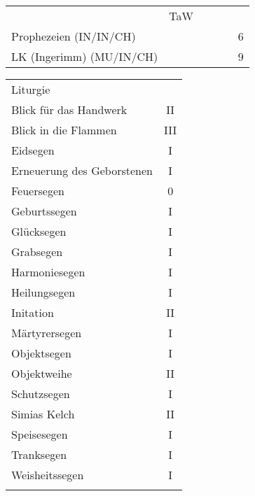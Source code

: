 \documentclass{article}
\newcommand{\tawLk}{9}
\newcommand{\tawPr}{6}
\begin{document}
  \begin{table}[ht]
    \centering
    \begin{tabularx}{0.8\linewidth}{|Xclcc|c|}
      \hline
      \rowcolor{gray}\multicolumn{5}{|l|}{Gabe (F)}&TaW\\
      \rowcolor{white} Prophezeien (IN/IN/CH) &&&&& \tawPr\\
      \rowcolor{white} LK (Ingerimm) (MU/IN/CH) &&&&& \tawLk\\
      \hline
    \end{tabularx}
      \centering
      \begin{tabularx}{0.8\linewidth}{|Xc|}
          \hline
          \rowcolor{gray} Liturgie & \\
          \rowcolor{white} Blick für das Handwerk& II\\
          \rowcolor{white} Blick in die Flammen & III\\
          \rowcolor{white} Eidsegen& I \\
          \rowcolor{white} Erneuerung des Geborstenen& I \\
          \rowcolor{white} Feuersegen& 0 \\
          \rowcolor{white} Geburtssegen& I \\
          \rowcolor{white} Glücksegen& I \\
          \rowcolor{white} Grabsegen& I \\
          \rowcolor{white} Harmoniesegen& I \\
          \rowcolor{white} Heilungsegen& I \\
          \rowcolor{white} Initation& II\\
          \rowcolor{white} Märtyrersegen& I \\
          \rowcolor{white} Objektsegen& I\\
          \rowcolor{white} Objektweihe& II\\
          \rowcolor{white} Schutzsegen& I \\
          \rowcolor{white} Simias Kelch& II\\
          \rowcolor{white} Speisesegen& I \\
          \rowcolor{white} Tranksegen& I \\
          \rowcolor{white} Weisheitssegen& I \\
          \rowcolor{white}
          \hline
      \end{tabularx}
  \end{table}
\end{document}
